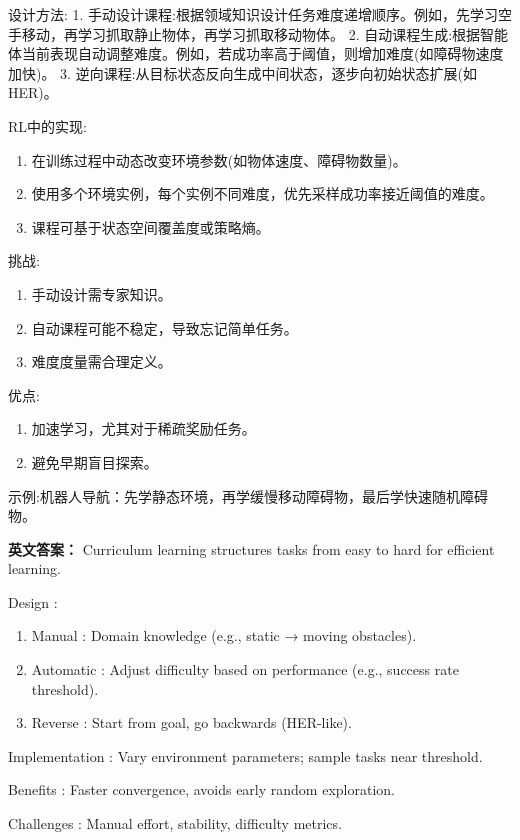 \documentclass[10pt,a4paper]{ctexart}
\begin{document}
 设计方法:
1.  手动设计课程:根据领域知识设计任务难度递增顺序。例如，先学习空手移动，再学习抓取静止物体，再学习抓取移动物体。
2.  自动课程生成:根据智能体当前表现自动调整难度。例如，若成功率高于阈值，则增加难度(如障碍物速度加快)。
3.  逆向课程:从目标状态反向生成中间状态，逐步向初始状态扩展(如HER)。

 RL中的实现:
\begin{enumerate}
    \item 在训练过程中动态改变环境参数(如物体速度、障碍物数量)。
    \item 使用多个环境实例，每个实例不同难度，优先采样成功率接近阈值的难度。
    \item 课程可基于状态空间覆盖度或策略熵。
\end{enumerate}

 挑战:
\begin{enumerate}
    \item 手动设计需专家知识。
    \item 自动课程可能不稳定，导致忘记简单任务。
    \item 难度度量需合理定义。
\end{enumerate}

 优点:
\begin{enumerate}
    \item 加速学习，尤其对于稀疏奖励任务。
    \item 避免早期盲目探索。
\end{enumerate}

 示例:机器人导航：先学静态环境，再学缓慢移动障碍物，最后学快速随机障碍物。

\textbf{英文答案：}  
Curriculum learning structures tasks from easy to hard for efficient learning.

 Design :
\begin{enumerate}
    \item Manual : Domain knowledge (e.g., static → moving obstacles).
    \item Automatic : Adjust difficulty based on performance (e.g., success rate threshold).
    \item Reverse : Start from goal, go backwards (HER-like).
\end{enumerate}

 Implementation : Vary environment parameters; sample tasks near threshold.

 Benefits : Faster convergence, avoids early random exploration.

 Challenges : Manual effort, stability, difficulty metrics.
\end{document}
